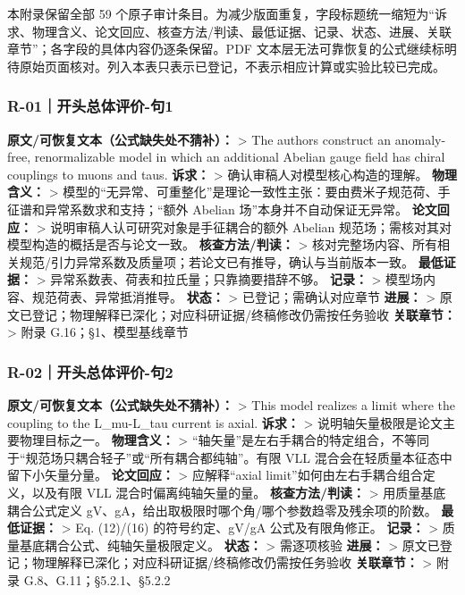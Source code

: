 \documentclass[
  chinese,
  UTF8]{ctexart}
\begin{document}
本附录保留全部 59
个原子审计条目。为减少版面重复，字段标题统一缩短为``诉求、物理含义、论文回应、核查方法/判读、最低证据、记录、状态、进展、关联章节''；各字段的具体内容仍逐条保留。PDF
文本层无法可靠恢复的公式继续标明待原始页面核对。列入本表只表示已登记，不表示相应计算或实验比较已完成。

\subsubsection{R-01｜开头总体评价-句1}\label{r-01ux5f00ux5934ux603bux4f53ux8bc4ux4ef7-ux53e51}

\textbf{原文/可恢复文本（公式缺失处不猜补）：} \textgreater{} The
authors construct an anomaly-free, renormalizable model in which an
additional Abelian gauge field has chiral couplings to muons and taus.
\textbf{诉求：} \textgreater{} 确认审稿人对模型核心构造的理解。
\textbf{物理含义：} \textgreater{}
模型的``无异常、可重整化''是理论一致性主张：要由费米子规范荷、手征谱和异常系数求和支持；``额外
Abelian 场''本身并不自动保证无异常。 \textbf{论文回应：} \textgreater{}
说明审稿人认可研究对象是手征耦合的额外 Abelian
规范场；需核对其对模型构造的概括是否与论文一致。
\textbf{核查方法/判读：} \textgreater{}
核对完整场内容、所有相关规范/引力异常系数及质量项；若论文已有推导，确认与当前版本一致。
\textbf{最低证据：} \textgreater{}
异常系数表、荷表和拉氏量；只靠摘要措辞不够。 \textbf{记录：}
\textgreater{} 模型场内容、规范荷表、异常抵消推导。 \textbf{状态：}
\textgreater{} 已登记；需确认对应章节 \textbf{进展：} \textgreater{}
原文已登记；物理解释已深化；对应科研证据/终稿修改仍需按任务验收
\textbf{关联章节：} \textgreater{} 附录 G.16；§1、模型基线章节

\subsubsection{R-02｜开头总体评价-句2}\label{r-02ux5f00ux5934ux603bux4f53ux8bc4ux4ef7-ux53e52}

\textbf{原文/可恢复文本（公式缺失处不猜补）：} \textgreater{} This model
realizes a limit where the coupling to the L\_mu-L\_tau current is
axial. \textbf{诉求：} \textgreater{}
说明轴矢量极限是论文主要物理目标之一。 \textbf{物理含义：}
\textgreater{}
``轴矢量''是左右手耦合的特定组合，不等同于``规范场只耦合轻子''或``所有耦合都纯轴''。有限
VLL 混合会在轻质量本征态中留下小矢量分量。 \textbf{论文回应：}
\textgreater{} 应解释``axial limit''如何由左右手耦合组合定义，以及有限
VLL 混合时偏离纯轴矢量的量。 \textbf{核查方法/判读：} \textgreater{}
用质量基底耦合公式定义
gV、gA，给出取极限时哪个角/哪个参数趋零及残余项的阶数。
\textbf{最低证据：} \textgreater{} Eq. (12)/(16) 的符号约定、gV/gA
公式及有限角修正。 \textbf{记录：} \textgreater{}
质量基底耦合公式、纯轴矢量极限定义。 \textbf{状态：} \textgreater{}
需逐项核验 \textbf{进展：} \textgreater{}
原文已登记；物理解释已深化；对应科研证据/终稿修改仍需按任务验收
\textbf{关联章节：} \textgreater{} 附录 G.8、G.11；§5.2.1、§5.2.2
\end{document}
